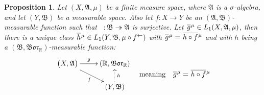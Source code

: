 \documentclass[
twoside=true,
paper=letter,
fontsize=9pt,
pagesize=auto,
leqno,
openany,
headsepline,
overfullrule,
]{scrbook}
\theoremstyle{plain}
\theoremstyle{plain}
\newtheorem{prop}[thm]{Proposition}
\theoremstyle{definition}
\theoremstyle{bfnoteitalic}
\theoremstyle{bfnoteroman}
\newcommand{\sigalg}[1]{\mathfrak{#1}}
\newcommand{\borel}{\mathfrak{Bor}}
\newcommand{\textsigma}{\hbox{\large{$\sigma$}}\kern-1pt}
\newcommand{\preimage}[1]{\mathop{#1^{\leftarrow}}}
\newcommand{\R}{\mathbb{R}}
\newcommand{\sigmaalgebra}{\sigalg{A}}
\newcommand{\sigmaalgebraii}{\sigalg{B}}
\newcommand{\measurespace}{X}
\newcommand{\measurespaceii}{Y}
\newcommand{\measure}{\mu}
\newcommand*\xbar[1]{%
   \hbox{%
     \vbox{%
       \hrule height 0.4pt %
       \kern0.4ex%
       \hbox{%
         \ensuremath{#1}%
       }%
     }%
   }%
}
\newcommand{\lebclass}[1]{\hspace{.5pt}\xbar{#1}\hspace{0.5pt}}
\newcommand{\ellclass}[2]{\lebclass{#1}^{#2}}
\begin{document}
\begin{prop}\label{factoring_functions}
Let $(\measurespace, \sigmaalgebra, \measure)$  be a finite measure space, where $\sigmaalgebra$ is a \textsigma-algebra, and let $(\measurespaceii, \sigmaalgebraii)$ be a measurable space.
Also let $f:\measurespace\to\measurespaceii$ be an $(\sigmaalgebra, \sigmaalgebraii)$\hyp{}measurable function such that 
$\preimage{f}:\sigmaalgebraii \twoheadrightarrow\sigmaalgebra$ is surjective.
Let
$\ellclass{g}{\measure}
\in L_1(\measurespace, \sigmaalgebra, \measure)$,
then there is a unique class
$\ellclass{h}{\measure}
\in L_1 (\measurespaceii, \sigmaalgebraii, \measure\circ\preimage{f})$
with 
$\ellclass{g}{\measure} 
= 
\ellclass{h\circ f}{\measure}$
and with $h$ being a $(\sigmaalgebraii, \borel_\R)$\hyp{}measurable function:
\[
\begin{gathered}
\xymatrix@R=16pt{ 
\bigl( \measurespace, \sigmaalgebra \bigr) \ar[r]^-{g} 
\ar[dr]_{f}
&
(\R,\borel_\R)  
\\
&
(\measurespaceii, \sigmaalgebraii) \ar@{.>}[u]_{h}
\\
}
\end{gathered}
\quad
\text{meaning}
\quad
\ellclass{g}{\measure}=\ellclass{h\circ f}{\measure}
\]
\end{prop}
\end{document}

